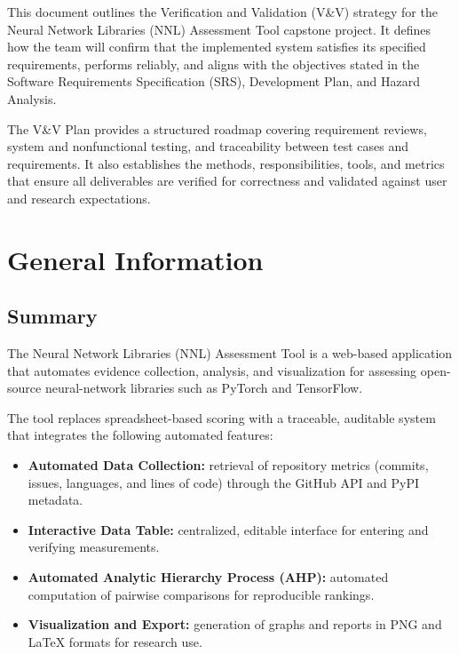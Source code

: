 \documentclass[12pt, titlepage]{article}
\begin{document}
This document outlines the Verification and Validation (V\&V) strategy for the
Neural Network Libraries (NNL) Assessment Tool capstone project. It defines how
the team will confirm that the implemented system satisfies its specified
requirements, performs reliably, and aligns with the objectives stated in the
Software Requirements Specification (SRS), Development Plan, and Hazard
Analysis.

The V\&V Plan provides a structured roadmap covering requirement reviews,
system and nonfunctional testing, and traceability between test cases and
requirements. It also establishes the methods, responsibilities, tools, and
metrics that ensure all deliverables are verified for correctness and validated
against user and research expectations.

\section{General Information}
\label{sec:general-info}
\subsection{Summary}
\label{subsec:summary}
The Neural Network Libraries (NNL) Assessment Tool is a web-based application
that automates evidence collection, analysis, and visualization for assessing
open-source neural-network libraries such as PyTorch and TensorFlow.

The tool replaces spreadsheet-based scoring with a traceable, auditable system
that integrates the following automated features:

\begin{itemize}
  \item \textbf{Automated Data Collection:} retrieval of repository metrics
  (commits, issues, languages, and lines of code) through the GitHub API and
  PyPI metadata.

  \item \textbf{Interactive Data Table:} centralized, editable interface for
  entering and verifying measurements.

  \item \textbf{Automated Analytic Hierarchy Process (AHP):} automated
  computation of pairwise comparisons for reproducible rankings.

  \item \textbf{Visualization and Export:} generation of graphs and reports in
  PNG and \LaTeX{} formats for research use.
\end{itemize}
\end{document}
